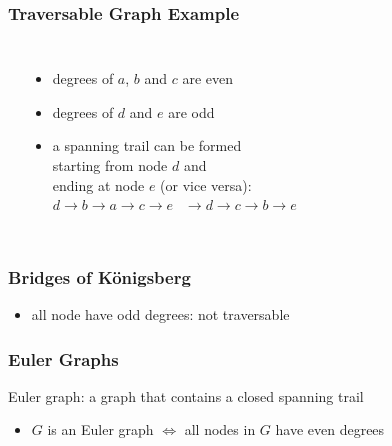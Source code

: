 \documentclass[dvipsnames]{beamer}
\begin{document}
\begin{frame}
  \frametitle{Traversable Graph Example}

  \begin{example}
    \begin{columns}
      \begin{center}
      \end{center}

      \begin{itemize}
        \item degrees of $a$, $b$ and $c$ are even
        \item degrees of $d$ and $e$ are odd

        \pause
        \medskip
        \item a spanning trail can be formed\\
          starting from node $d$ and\\
          ending at node $e$ (or vice versa):\\
          $d \rightarrow b \rightarrow a \rightarrow c \rightarrow e$
          $~~\rightarrow d \rightarrow c \rightarrow b \rightarrow e$
      \end{itemize}
    \end{columns}
  \end{example}
\end{frame}

\begin{frame}
  \frametitle{Bridges of Königsberg}

  \begin{center}
  \end{center}

  \begin{itemize}
    \item all node have odd degrees: not traversable
  \end{itemize}
\end{frame}

\begin{frame}
  \frametitle{Euler Graphs}

  \begin{definition}
    \alert{Euler graph}: a graph that contains a closed spanning trail
  \end{definition}

  \begin{itemize}
    \item $G$ is an Euler graph $\Leftrightarrow$
      all nodes in $G$ have even degrees
  \end{itemize}
\end{frame}
\end{document}
